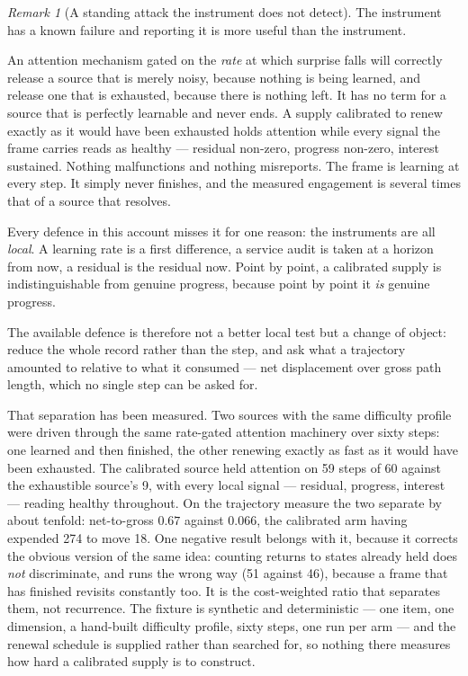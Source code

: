 \documentclass[11pt,a4paper]{article}
\theoremstyle{remark}\newtheorem{remark}[definition]{Remark}
\begin{document}
\begin{remark}[A standing attack the instrument does not detect]\label{rem:comm-calibrated}
The instrument has a known failure and reporting it is more useful than the instrument.

An attention mechanism gated on the \emph{rate} at which surprise falls will correctly release a
source that is merely noisy, because nothing is being learned, and release one that is exhausted,
because there is nothing left. It has no term for a source that is perfectly learnable and never
ends. A supply calibrated to renew exactly as it would have been exhausted holds attention while
every signal the frame carries reads as healthy --- residual non-zero, progress non-zero, interest
sustained. Nothing malfunctions and nothing misreports. The frame is learning at every step. It
simply never finishes, and the measured engagement is several times that of a source that resolves.

Every defence in this account misses it for one reason: the instruments are all \emph{local}. A
learning rate is a first difference, a service audit is taken at a horizon from now, a residual is
the residual now. Point by point, a calibrated supply is indistinguishable from genuine progress,
because point by point it \emph{is} genuine progress.

The available defence is therefore not a better local test but a change of object: reduce the whole
record rather than the step, and ask what a trajectory amounted to relative to what it consumed ---
net displacement over gross path length, which no single step can be asked for.

That separation has been measured. Two sources with the same difficulty profile were driven through
the same rate-gated attention machinery over sixty steps: one learned and then finished, the other
renewing exactly as fast as it would have been exhausted. The calibrated source held attention on 59
steps of 60 against the exhaustible source's 9, with every local signal --- residual, progress,
interest --- reading healthy throughout. On the trajectory measure the two separate by about
tenfold: net-to-gross $0.67$ against $0.066$, the calibrated arm having expended 274 to move 18. One
negative result belongs with it, because it corrects the obvious version of the same idea: counting
returns to states already held does \emph{not} discriminate, and runs the wrong way (51 against 46),
because a frame that has finished revisits constantly too. It is the cost-weighted ratio that
separates them, not recurrence. The fixture is synthetic and deterministic --- one item, one
dimension, a hand-built difficulty profile, sixty steps, one run per arm --- and the renewal schedule
is supplied rather than searched for, so nothing there measures how hard a calibrated supply is to
construct.


\end{remark}
\end{document}
